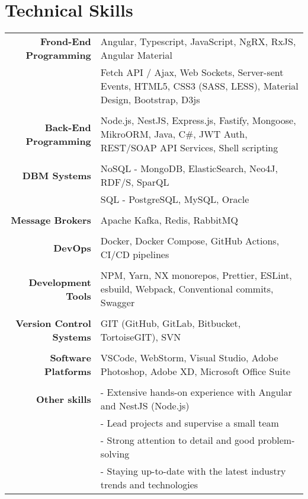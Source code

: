 \documentclass[11pt]{article}
\begin{document}
\section{Technical Skills}

\begin{longtable}{rp{12cm}}

\textbf{Frond-End Programming} 
& Angular, Typescript, JavaScript, NgRX, RxJS, Angular Material \\
& Fetch API / Ajax, Web Sockets, Server-sent Events, HTML5, CSS3 (SASS, LESS), Material Design, Bootstrap, D3js \\

\multicolumn{2}{c}{} \\
\textbf{Back-End Programming} 
& Node.js, NestJS, Express.js, Fastify, Mongoose, MikroORM, Java, C\#, JWT Auth, REST/SOAP API Services, Shell scripting \\

\multicolumn{2}{c}{} \\
\textbf{DBM Systems} 
& NoSQL - MongoDB, ElasticSearch, Neo4J, RDF/S, SparQL \\
& SQL - PostgreSQL, MySQL, Oracle  \\

\multicolumn{2}{c}{} \\
\textbf{Message Brokers} 
& Apache Kafka, Redis, RabbitMQ \\

\multicolumn{2}{c}{} \\
\textbf{DevOps} 
& Docker, Docker Compose, GitHub Actions, CI/CD pipelines \\

\multicolumn{2}{c}{} \\
\textbf{Development Tools} 
& NPM, Yarn, NX monorepos, Prettier, ESLint, esbuild, Webpack, Conventional commits, Swagger \\

\multicolumn{2}{c}{} \\
\textbf{Version Control Systems} 
& GIT (GitHub, GitLab, Bitbucket, TortoiseGIT), SVN \\

\multicolumn{2}{c}{} \\
\textbf{Software Platforms} 
& VSCode, WebStorm, Visual Studio, Adobe Photoshop, Adobe XD, Microsoft Office Suite \\

\multicolumn{2}{c}{} \\
\textbf{Other skills} 
& - Extensive hands-on experience with Angular and NestJS (Node.js) \\
& - Lead projects and supervise a small team \\
& - Strong attention to detail and good problem-solving \\
& - Staying up-to-date with the latest industry trends and technologies \\


\end{longtable}
\end{document}
